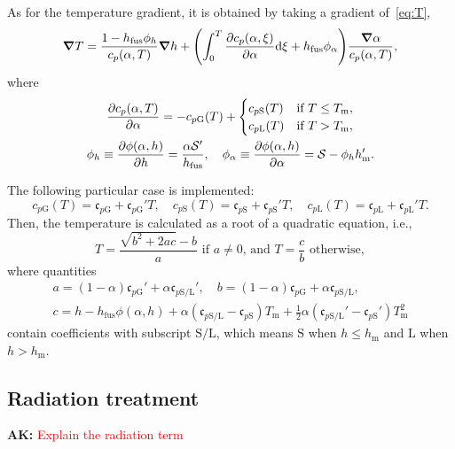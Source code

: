 \documentclass[final]{elsarticle} %
\newcommand{\fusion}[1]{{#1}_\text{fus}}
\newcommand{\Cp}[1]{\mathfrak{c}_{p#1}}
\newcommand{\sol}{\text{S}}
\newcommand{\liq}{\text{L}}
\newcommand{\gas}{\text{G}}
\newcommand{\melt}{\text{m}}
\newcommand{\ak}[1] {\textbf{AK:} \textcolor{red}{#1}}
\begin{document}
As for the temperature gradient, it is obtained by taking a gradient of~\eqref{eq:T},
\begin{equation}\label{eq:T_gradient}
    \grad{T} = \frac{1 - \fusion{h}\phi_h}{c_p(\alpha,T)}\grad{h}
        + \qty(
            \int_0^T \pdv{c_p(\alpha,\xi)}{\alpha}\dd\xi + \fusion{h}\phi_\alpha
        )\frac{\grad\alpha}{c_p(\alpha,T)},
\end{equation}
where
\begin{gather}
    \pdv{c_p(\alpha,T)}{\alpha} = -c_{p\gas}(T) +
        \begin{cases}
            c_{p\sol}(T) &\text{if } T \leq T_\melt, \\
            c_{p\liq}(T) &\text{if } T > T_\melt,
        \end{cases} \label{eq:c_palpha}\\
    \phi_h \equiv \pdv{\phi(\alpha,h)}{h} = \frac{\alpha\mathcal{S}'}{\fusion{h}}, \quad
    \phi_\alpha \equiv \pdv{\phi(\alpha,h)}{\alpha} = \mathcal{S} - \phi_h h_\melt'. \label{eq:phi_derivatives}
\end{gather}

The following particular case is implemented:
\begin{equation}\label{eq:c_p_special}
    c_{p\gas}(T) = \Cp{\gas} + \Cp{\gas}'T, \quad
    c_{p\sol}(T) = \Cp{\sol} + \Cp{\sol}'T, \quad
    c_{p\liq}(T) = \Cp{\liq} + \Cp{\liq}'T.
\end{equation}
Then, the temperature is calculated as a root of a quadratic equation, i.e.,
\begin{equation}\label{eq:T_special}
    T = \frac{\sqrt{b^2 + 2ac} - b}{a} \text{ if } a\neq0 \text{, and }
    T = \frac{c}{b} \text{ otherwise},
\end{equation}
where quantities
\begin{equation}\label{eq:abc}
    \begin{gathered}
        a = (1-\alpha)\Cp{\gas}' + \alpha\Cp{\sol/\liq}', \quad
        b = (1-\alpha)\Cp{\gas} + \alpha\Cp{\sol/\liq}, \\
        c = h - \fusion{h}\phi(\alpha,h) + \alpha(\Cp{\sol/\liq}-\Cp{\sol})T_\melt
            + \tfrac12\alpha(\Cp{\sol/\liq}'-\Cp{\sol}')T_\melt^2
    \end{gathered}
\end{equation}
contain coefficients with subscript $\sol/\liq$,
which means $\sol$ when $h\leq h_\melt$ and $\liq$ when $h>h_\melt$.

\subsection{Radiation treatment}
\ak{Explain the radiation term}
\end{document}
